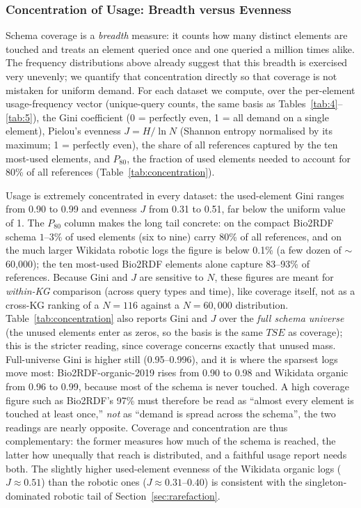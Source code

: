 \documentclass[sw]{iosart2x}
\begin{document}
\subsubsection{Concentration of Usage: Breadth versus Evenness}\label{sec:concentration}
Schema coverage is a \emph{breadth} measure: it counts how many distinct elements are touched and treats an element queried once and one queried a million times alike. The frequency distributions above already suggest that this breadth is exercised very unevenly; we quantify that concentration directly so that coverage is not mistaken for uniform demand. For each dataset we compute, over the per-element usage-frequency vector (unique-query counts, the same basis as Tables~\ref{tab:4}--\ref{tab:5}), the Gini coefficient (0 = perfectly even, 1 = all demand on a single element), Pielou's evenness $J = H/\ln N$ (Shannon entropy normalised by its maximum; 1 = perfectly even), the share of all references captured by the ten most-used elements, and $P_{80}$, the fraction of used elements needed to account for 80\% of all references (Table~\ref{tab:concentration}).

Usage is extremely concentrated in every dataset: the used-element Gini ranges from 0.90 to 0.99 and evenness $J$ from 0.31 to 0.51, far below the uniform value of 1. The $P_{80}$ column makes the long tail concrete: on the compact Bio2RDF schema $1$--$3\%$ of used elements (six to nine) carry 80\% of all references, and on the much larger Wikidata robotic logs the figure is below 0.1\% (a few dozen of $\sim$60{,}000); the ten most-used Bio2RDF elements alone capture 83--93\% of references. Because Gini and $J$ are sensitive to $N$, these figures are meant for \emph{within-KG} comparison (across query types and time), like coverage itself, not as a cross-KG ranking of a $N{=}116$ against a $N{=}60{,}000$ distribution. Table~\ref{tab:concentration} also reports Gini and $J$ over the \emph{full schema universe} (the unused elements enter as zeros, so the basis is the same $TSE$ as coverage); this is the stricter reading, since coverage concerns exactly that unused mass. Full-universe Gini is higher still (0.95--0.996), and it is where the sparsest logs move most: Bio2RDF-organic-2019 rises from 0.90 to 0.98 and Wikidata organic from 0.96 to 0.99, because most of the schema is never touched. A high coverage figure such as Bio2RDF's 97\% must therefore be read as ``almost every element is touched at least once,'' \emph{not} as ``demand is spread across the schema'', the two readings are nearly opposite. Coverage and concentration are thus complementary: the former measures how much of the schema is reached, the latter how unequally that reach is distributed, and a faithful usage report needs both. The slightly higher used-element evenness of the Wikidata organic logs ($J \approx 0.51$) than the robotic ones ($J \approx 0.31$--$0.40$) is consistent with the singleton-dominated robotic tail of Section~\ref{sec:rarefaction}.
\end{document}
